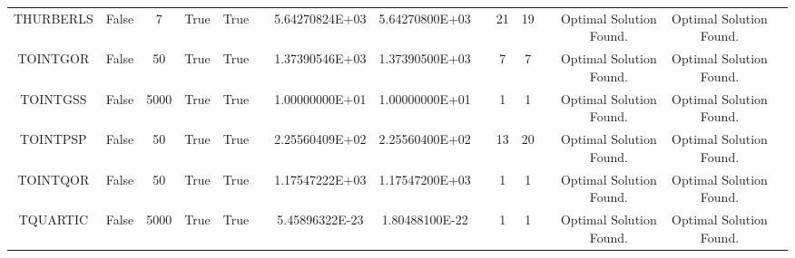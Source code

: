 \begin{longtable}{ccccccccccccccc}
	\cellcolor{default2} THURBERLS& \cellcolor{default2} False& \cellcolor{default2} 7& \cellcolor{default2} True& \cellcolor{default2} True& \cellcolor{header} & \cellcolor{ok} 5.64270824E+03& \cellcolor{best} 5.64270800E+03& \cellcolor{header} & \cellcolor{ok} 21& \cellcolor{best} 19& \cellcolor{header} & \cellcolor{default2} Optimal Solution Found.& \cellcolor{default2} Optimal Solution Found.& \cellcolor{header} \\
	\cellcolor{default1} TOINTGOR& \cellcolor{default1} False& \cellcolor{default1} 50& \cellcolor{default1} True& \cellcolor{default1} True& \cellcolor{header} & \cellcolor{ok} 1.37390546E+03& \cellcolor{best} 1.37390500E+03& \cellcolor{header} & \cellcolor{best} 7& \cellcolor{best} 7& \cellcolor{header} & \cellcolor{default1} Optimal Solution Found.& \cellcolor{default1} Optimal Solution Found.& \cellcolor{header} \\
	\cellcolor{default2} TOINTGSS& \cellcolor{default2} False& \cellcolor{default2} 5000& \cellcolor{default2} True& \cellcolor{default2} True& \cellcolor{header} & \cellcolor{best} 1.00000000E+01& \cellcolor{ok} 1.00000000E+01& \cellcolor{header} & \cellcolor{best} 1& \cellcolor{best} 1& \cellcolor{header} & \cellcolor{default2} Optimal Solution Found.& \cellcolor{default2} Optimal Solution Found.& \cellcolor{header} \\
	\cellcolor{default1} TOINTPSP& \cellcolor{default1} False& \cellcolor{default1} 50& \cellcolor{default1} True& \cellcolor{default1} True& \cellcolor{header} & \cellcolor{ok} 2.25560409E+02& \cellcolor{best} 2.25560400E+02& \cellcolor{header} & \cellcolor{best} 13& \cellcolor{ok} 20& \cellcolor{header} & \cellcolor{default1} Optimal Solution Found.& \cellcolor{default1} Optimal Solution Found.& \cellcolor{header} \\
	\cellcolor{default2} TOINTQOR& \cellcolor{default2} False& \cellcolor{default2} 50& \cellcolor{default2} True& \cellcolor{default2} True& \cellcolor{header} & \cellcolor{ok} 1.17547222E+03& \cellcolor{best} 1.17547200E+03& \cellcolor{header} & \cellcolor{best} 1& \cellcolor{best} 1& \cellcolor{header} & \cellcolor{default2} Optimal Solution Found.& \cellcolor{default2} Optimal Solution Found.& \cellcolor{header} \\
	\cellcolor{default1} TQUARTIC& \cellcolor{default1} False& \cellcolor{default1} 5000& \cellcolor{default1} True& \cellcolor{default1} True& \cellcolor{header} & \cellcolor{best} 5.45896322E-23& \cellcolor{ok} 1.80488100E-22& \cellcolor{header} & \cellcolor{best} 1& \cellcolor{best} 1& \cellcolor{header} & \cellcolor{default1} Optimal Solution Found.& \cellcolor{default1} Optimal Solution Found.& \cellcolor{header} \\

\end{longtable}
